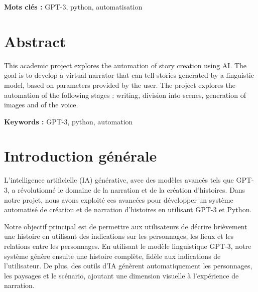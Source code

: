 \documentclass[11,5pt]{report}
\begin{document}
\begin{spacing}{2}
\begin{onehalfspace}
\textbf{Mots clés : } GPT-3, python, automatisation
\end{onehalfspace}
\thispagestyle{empty}
\newpage

\chapter*{Abstract}
\large
\begin{onehalfspace}
This academic project explores the automation of story creation using AI. The goal is to develop a virtual narrator that can tell stories generated by a linguistic model, based on parameters provided by the user. The project explores the automation of the following stages :  writing, division into scenes, generation of images and of the voice.

\textbf{Keywords : } GPT-3, python, automation
\end{onehalfspace}
\thispagestyle{empty}
\newpage

\listoffigures
\thispagestyle{empty}
\tableofcontents
\thispagestyle{empty}
\newpage

\renewcommand{\arraystretch}{1}


\chapter*{Introduction générale}

\begin{onehalfspace}
L'intelligence artificielle (IA) générative, avec des modèles avancés tels que GPT-3, a révolutionné le domaine de la narration et de la création d'histoires. Dans notre projet, nous avons exploité ces avancées pour développer un système automatisé de création et de narration d'histoires en utilisant GPT-3 et Python.

Notre objectif principal est de permettre aux utilisateurs de décrire brièvement une histoire en utilisant des indications sur les personnages, les lieux et les relations entre les personnages. En utilisant le modèle linguistique GPT-3, notre système génère ensuite une histoire complète, fidèle aux indications de l'utilisateur. De plus, des outils d'IA génèrent automatiquement les personnages, les paysages et le scénario, ajoutant une dimension visuelle à l'expérience de narration.


\end{onehalfspace}
\end{spacing}
\end{document}
